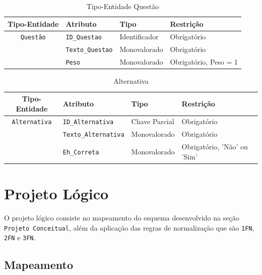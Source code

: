 \documentclass[12pt,a4paper]{article}
\begin{document}
\begin{table}[h]
  \centering
  \caption{Tipo-Entidade Questão}
    \begin{tabular}{|c|c|l|l|l|}
    \toprule\hline
    \multicolumn{2}{|c|}{\textbf{Tipo-Entidade}} & \textbf{Atributo} & \textbf{Tipo} & \textbf{Restrição} \\\hline
    \midrule
    \multicolumn{2}{|c|}{\texttt{Questão}} & \texttt{ID\_Questao} & Identificador & Obrigatório \\
    \midrule
    \multicolumn{2}{|c|}{} & \texttt{Texto\_Questao} & Monovalorado & Obrigatório \\
    \midrule
    \multicolumn{2}{|c|}{} & \texttt{Peso} & Monovalorado & Obrigatório, Peso = 1 \\
    \midrule
    \bottomrule\hline
    \end{tabular}%
  \label{tab:meta_questao}%
\end{table}%

\begin{table}[h]
  \centering
  \caption{Alternativa}
    \begin{tabular}{|c|c|l|l|l|}
    \toprule\hline
    \multicolumn{2}{|c|}{\textbf{Tipo-Entidade}} & \textbf{Atributo} & \textbf{Tipo} & \textbf{Restrição} \\\hline
    \midrule
    \multicolumn{2}{|c|}{\texttt{Alternativa}} & \texttt{ID\_Alternativa} & Chave Parcial & Obrigatório \\
    \midrule
    \multicolumn{2}{|c|}{} & \texttt{Texto\_Alternativa} & Monovalorado & Obrigatório \\
    \midrule
    \multicolumn{2}{|c|}{} & \texttt{Eh\_Correta} & Monovalorado & Obrigatório, 'Não' ou 'Sim' \\
    \midrule
    \bottomrule\hline
    \end{tabular}%
  \label{tab:meta_alternativa}%
\end{table}%
\pagebreak

\section{Projeto Lógico}

O projeto lógico consiste no mapeamento do esquema desenvolvido na seção \texttt{Projeto Conceitual}, além da aplicação das regras de normalização que são \texttt{1FN}, \texttt{2FN} e \texttt{3FN}.

\subsection{Mapeamento}
\end{document}
